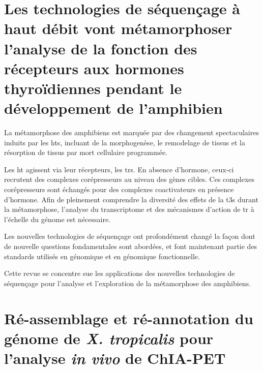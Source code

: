 \documentclass[../main.tex]{subfiles}
\begin{document}
\clearpage
\newpage


\glsresetall
\section{Les technologies de séquençage à haut débit vont métamorphoser l'analyse de la fonction des récepteurs aux hormones thyroïdiennes pendant le développement de l'amphibien}\label{sec:ctdb-review}

\begin{abstractfr}
La métamorphose des amphibiens est marquée par des changement spectaculaires induits par les \glspl{ht}, incluant de la morphogenèse, le remodelage de tissus et la résorption de tissus par mort cellulaire programmée.
\par
Les \gls{ht} agissent via leur récepteurs, les \glspl{tr}.
En absence d'hormone, ceux-ci recrutent des complexes corépresseurs au niveau des gènes cibles.
Ces complexes corépresseurs sont échangés pour des complexes coactivateurs en présence d'hormone.
Afin de pleinement comprendre la diversité des effets de la \glspl{t3} durant la métamorphose, l'analyse du transcriptome et des mécanismes d'action de \gls{tr} à l'échelle du génome est nécessaire.
\par
Les nouvelles technologies de séquençage ont profondément changé la façon dont de nouvelle questions fondamentales sont abordées, et font maintenant partie des standards utilisés en génomique et en génomique fonctionnelle.
\par
Cette revue se concentre sue les applications des nouvelles technologies de séquençage pour l'analyse et l'exploration de la métamorphose des amphibiens.
\end{abstractfr}


% 

\clearpage
\newpage

\glsresetall
\section{Ré-assemblage et ré-annotation du génome de \textit{X. tropicalis} pour l'analyse \textit{in vivo} de ChIA-PET}\label{sec:buisine2014}
\end{document}
